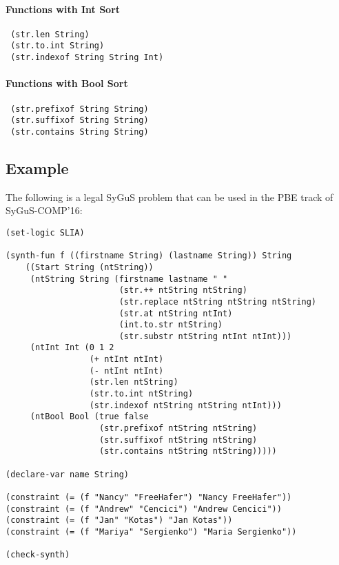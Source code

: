 \documentclass{llncs}
\begin{document}
\paragraph{Functions with Int Sort}
\begin{verbatim}
 (str.len String) 
 (str.to.int String)
 (str.indexof String String Int)
\end{verbatim}

\paragraph{Functions with Bool Sort}
\begin{verbatim}
 (str.prefixof String String) 
 (str.suffixof String String)
 (str.contains String String)
\end{verbatim}




\subsection*{Example}
The following is a legal SyGuS problem that can be used in the PBE track of SyGuS-COMP'16:

\begin{verbatim}
(set-logic SLIA)

(synth-fun f ((firstname String) (lastname String)) String
    ((Start String (ntString))
     (ntString String (firstname lastname " "
                       (str.++ ntString ntString)
                       (str.replace ntString ntString ntString)
                       (str.at ntString ntInt)
                       (int.to.str ntString)
                       (str.substr ntString ntInt ntInt)))
     (ntInt Int (0 1 2
                 (+ ntInt ntInt)
                 (- ntInt ntInt)
                 (str.len ntString)
                 (str.to.int ntString)
                 (str.indexof ntString ntString ntInt)))
     (ntBool Bool (true false
                   (str.prefixof ntString ntString)
                   (str.suffixof ntString ntString)
                   (str.contains ntString ntString)))))

(declare-var name String)

(constraint (= (f "Nancy" "FreeHafer") "Nancy FreeHafer"))
(constraint (= (f "Andrew" "Cencici") "Andrew Cencici"))
(constraint (= (f "Jan" "Kotas") "Jan Kotas"))
(constraint (= (f "Mariya" "Sergienko") "Maria Sergienko"))

(check-synth)
\end{verbatim}
\end{document}
